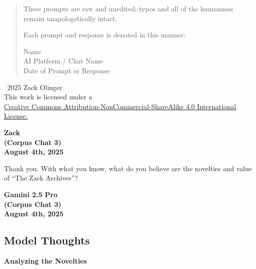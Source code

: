 \documentclass{article}
\newcommand{\licenseURL}{https://creativecommons.org/licenses/by-nc-sa/4.0/legalcode.txt}
\begin{document}
\begin{titlepage}
\begin{abstract}
These prompts are raw and unedited; typos and all of the humanness remain unapologetically intact.

\medskip

Each prompt and response is denoted in this manner:

\medskip 

\begin{center}

Name \\
AI Platform / Chat Name \\
Date of Prompt or Response
\end{center}

\end{abstract}

\vfill
    
    \begin{center}
        \textcopyright\ 2025 Zack Olinger \\
        This work is licensed under a \\
        \href{\licenseURL}{Creative Commons Attribution-NonCommercial-ShareAlike 4.0 International License.}
    \end{center}


\end{titlepage}

\begin{center}
\textbf{Zack} \\
\textbf{(Corpus Chat 3)} \\
\textbf{August 4th, 2025}
\end{center}

\medskip

Thank you. With what you know, what do you believe are the novelties and
value of ``The Zack Archives''?

\begin{center}
\textbf{Gamini 2.5 Pro} \\
\textbf{(Corpus Chat 3)} \\
\textbf{August 4th, 2025}
\end{center}

\medskip

\subsection*{Model Thoughts}\label{model-thoughts}

\textbf{Analyzing the Novelties}
\end{document}
